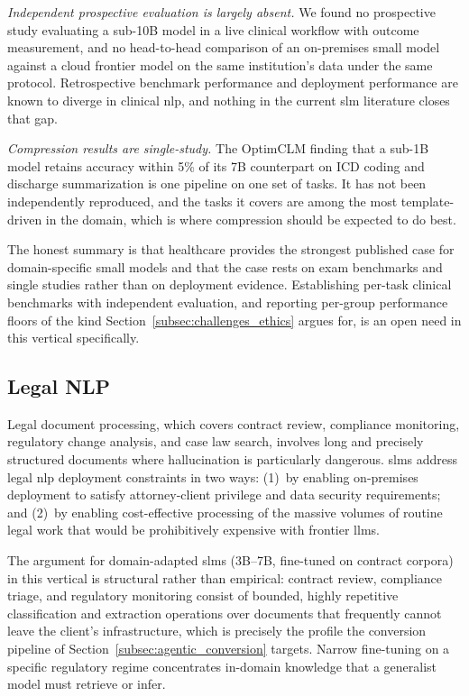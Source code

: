 \emph{Independent prospective evaluation is largely absent.} We found no
prospective study evaluating a sub-10B model in a live clinical workflow with
outcome measurement, and no head-to-head comparison of an on-premises small model
against a cloud frontier model on the same institution's data under the same
protocol. Retrospective benchmark performance and deployment performance are
known to diverge in clinical \gls{nlp}, and nothing in the current \gls{slm}
literature closes that gap.

\emph{Compression results are single-study.} The OptimCLM finding
\citep{hasan2024optimclm} that a sub-1B model retains accuracy within 5\% of its
7B counterpart on ICD coding and discharge summarization is one pipeline on one
set of tasks. It has not been independently reproduced, and the tasks it covers
are among the most template-driven in the domain, which is where compression
should be expected to do best.

The honest summary is that healthcare provides the strongest published case for
domain-specific small models and that the case rests on exam benchmarks and
single studies rather than on deployment evidence. Establishing per-task clinical
benchmarks with independent evaluation, and reporting per-group performance
floors of the kind Section~\ref{subsec:challenges_ethics} argues for, is an open
need in this vertical specifically.

\subsection{Legal NLP}
\label{subsec:applications_legal}

Legal document processing, which covers contract review, compliance monitoring, regulatory change analysis, and case law search, involves long and precisely structured documents where hallucination is particularly dangerous. \glspl{slm} address legal \gls{nlp} deployment constraints in two ways: (1)~by enabling on-premises deployment to satisfy attorney-client privilege and data security requirements; and (2)~by enabling cost-effective processing of the massive volumes of routine legal work that would be prohibitively expensive with frontier \glspl{llm}.

The argument for domain-adapted \glspl{slm} (3B--7B, fine-tuned on contract corpora) in this vertical is structural rather than empirical: contract review, compliance triage, and regulatory monitoring consist of bounded, highly repetitive classification and extraction operations over documents that frequently cannot leave the client's infrastructure, which is precisely the profile the conversion pipeline of Section~\ref{subsec:agentic_conversion} targets. Narrow fine-tuning on a specific regulatory regime concentrates in-domain knowledge that a generalist model must retrieve or infer.

